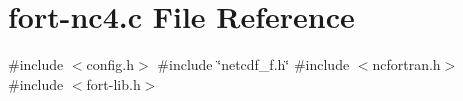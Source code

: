 \hypertarget{fort-nc4_8c}{}\section{fort-\/nc4.c File Reference}
\label{fort-nc4_8c}
{\ttfamily \#include $<$config.\+h$>$}\newline
{\ttfamily \#include \char`\"{}netcdf\+\_\+f.\+h\char`\"{}}\newline
{\ttfamily \#include $<$ncfortran.\+h$>$}\newline
{\ttfamily \#include $<$fort-\/lib.\+h$>$}\newline
